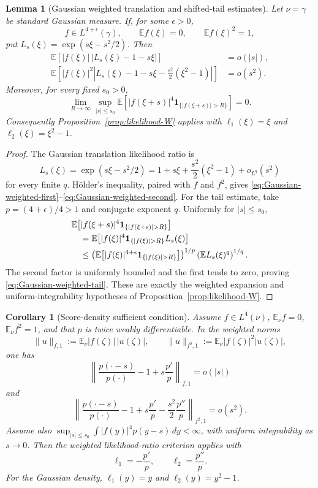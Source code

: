 \documentclass[11pt]{article}
\newtheorem{lemma}[theorem]{Lemma}
\newtheorem{corollary}[theorem]{Corollary}
\theoremstyle{definition}
\theoremstyle{remark}
\newcommand{\E}{\mathbb E}
\newcommand{\one}{\mathbf 1}
\begin{document}
\begin{lemma}[Gaussian weighted translation and shifted-tail estimates]
\label{lem:Gaussian-L4epsilon-W}
Let \(\nu=\gamma\) be standard Gaussian measure.  If, for some \(\epsilon>0\),
\[
        f\in L^{4+\epsilon}(\gamma),
        \qquad \E f(\xi)=0,
        \qquad \E f(\xi)^2=1,
\]
put $L_s(\xi)=\exp(s\xi-s^2/2)$.  Then
\begin{align}
 \E\!\left[|f(\xi)|\,|L_s(\xi)-1-s\xi|\right]
 &=o(|s|),\label{eq:Gaussian-weighted-first}\\
 \E\!\left[|f(\xi)|^2
 \left|L_s(\xi)-1-s\xi-\frac{s^2}{2}(\xi^2-1)\right|\right]
 &=o(s^2).\label{eq:Gaussian-weighted-second}
\end{align}
Moreover, for every fixed $s_0>0$,
\begin{equation}\label{eq:Gaussian-weighted-tail}
 \lim_{R\to\infty}\sup_{|s|\le s_0}
 \E\!\left[|f(\xi+s)|^4
 \one_{\{|f(\xi+s)|>R\}}\right]=0.
\end{equation}
Consequently Proposition~\ref{prop:likelihood-W} applies with
$\ell_1(\xi)=\xi$ and $\ell_2(\xi)=\xi^2-1$.
\end{lemma}

\begin{proof}
The Gaussian translation likelihood ratio is
\[
        L_s(\xi)=\exp(s\xi-s^2/2)
        =1+s\xi+\frac{s^2}{2}(\xi^2-1)+o_{L^q}(s^2)
\]
for every finite $q$.  H\"older's inequality, paired with $f$ and $f^2$,
gives \eqref{eq:Gaussian-weighted-first}--\eqref{eq:Gaussian-weighted-second}.
For the tail estimate, take $p=(4+\epsilon)/4>1$ and conjugate exponent $q$.
Uniformly for $|s|\le s_0$,
\begin{align*}
&\E\bigl[|f(\xi+s)|^4{\bf 1}_{\{|f(\xi+s)|>R\}}\bigr]\\
&\quad=\E\bigl[|f(\xi)|^4{\bf 1}_{\{|f(\xi)|>R\}}L_s(\xi)\bigr]\\
&\quad\le
\left(\E\bigl[|f(\xi)|^{4+\epsilon}{\bf 1}_{\{|f(\xi)|>R\}}\bigr]\right)^{1/p}
\left(\E L_s(\xi)^q\right)^{1/q}.
\end{align*}
The second factor is uniformly bounded and the first
tends to zero, proving \eqref{eq:Gaussian-weighted-tail}.  These are exactly
the weighted expansion and uniform-integrability hypotheses of
Proposition~\ref{prop:likelihood-W}.
\end{proof}

\begin{corollary}[Score-density sufficient condition]
\label{cor:score-W}
Assume \(f\in L^4(\nu)\), \(\E_\nu f=0\),
\(\E_\nu f^2=1\), and that \(p\) is twice weakly differentiable.  In the
weighted norms
\[
        \|u\|_{f,1}:=\E_\nu |f(\zeta)|\,|u(\zeta)|,
        \qquad
        \|u\|_{f^2,1}:=\E_\nu |f(\zeta)|^2|u(\zeta)|,
\]
one has
\[
        \left\|\frac{p(\cdot-s)}{p(\cdot)}-1+s\frac{p'}{p}\right\|_{f,1}=o(|s|)
\]
and
\[
        \left\|\frac{p(\cdot-s)}{p(\cdot)}-1+s\frac{p'}{p}-\frac{s^2}{2}\frac{p''}{p}\right\|_{f^2,1}=o(s^2).
\]
Assume also \(\sup_{|s|\le s_0}\int |f(y)|^4p(y-s)\,dy<\infty\), with uniform integrability as \(s\to0\).  Then the weighted likelihood-ratio criterion applies with
\[
        \ell_1=-\frac{p'}{p},\qquad \ell_2=\frac{p''}{p}.
\]
For the Gaussian density, \(\ell_1(y)=y\) and \(\ell_2(y)=y^2-1\).
\end{corollary}
\end{document}
